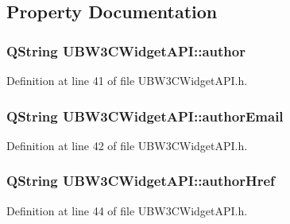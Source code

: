 \subsection{Property Documentation}
\hypertarget{class_u_b_w3_c_widget_a_p_i_a49c7138ed218b64fdc14cc475515d415}{
\subsubsection[{author}]{\setlength{\rightskip}{0pt plus 5cm}Q\-String U\-B\-W3\-C\-Widget\-A\-P\-I\-::author\hspace{0.3cm}{\ttfamily [read]}}}\label{da/d8c/class_u_b_w3_c_widget_a_p_i_a49c7138ed218b64fdc14cc475515d415}


Definition at line 41 of file U\-B\-W3\-C\-Widget\-A\-P\-I.\-h.

\hypertarget{class_u_b_w3_c_widget_a_p_i_aa8da17aa1b04a9de8d5b82f009cdaf9c}{
\subsubsection[{author\-Email}]{\setlength{\rightskip}{0pt plus 5cm}Q\-String U\-B\-W3\-C\-Widget\-A\-P\-I\-::author\-Email\hspace{0.3cm}{\ttfamily [read]}}}\label{da/d8c/class_u_b_w3_c_widget_a_p_i_aa8da17aa1b04a9de8d5b82f009cdaf9c}


Definition at line 42 of file U\-B\-W3\-C\-Widget\-A\-P\-I.\-h.

\hypertarget{class_u_b_w3_c_widget_a_p_i_a665ac2b44329d6d6062194c9738681b4}{
\subsubsection[{author\-Href}]{\setlength{\rightskip}{0pt plus 5cm}Q\-String U\-B\-W3\-C\-Widget\-A\-P\-I\-::author\-Href\hspace{0.3cm}{\ttfamily [read]}}}\label{da/d8c/class_u_b_w3_c_widget_a_p_i_a665ac2b44329d6d6062194c9738681b4}


Definition at line 44 of file U\-B\-W3\-C\-Widget\-A\-P\-I.\-h.

